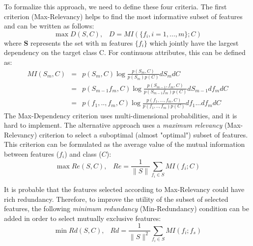 \documentclass[a4paper,fleqn]{report}
\begin{document}
To formalize this approach, we need to define these four criteria. The first criterion (Max-Relevancy) helps to find the most informative 
subset of features and can be written as follows:
\begin{equation} \label{eq:maxdep}
\max D \left( S, C \right),\;\;\; D=MI\left(\{f_i, i=1,...,m  \};C \right)
\end{equation}
where {\bf S} represents the set with m features $\{ f_i \}$ which jointly have the largest dependency on the target class C. 
For continuous attributes, this can be defined as:
\begin{eqnarray}
MI \left( S_m, C \right)  & = & p \left( S_m, C \right) \log \frac{p \left( S_m, C\right)}{p \left( S_m\right) p \left( C\right)} dS_{m}dC \\ \nonumber
                          & = & p \left( S_{m-1} f_m, C \right) \log \frac{p \left( S_{m-1}, f_m, C\right)}{p \left( S_{m-1} f_m\right) p \left( C\right)} dS_{m-1}df_{m}dC \\ \nonumber
                          & = & p \left( f_{1}, .. ,f_m,	 C \right) \log \frac{p \left( f_{1},...,f_m, C\right)}{p \left( f_{1},..,f_m\right) p \left( C\right)} df_{1} ... df_{m}dC 
\end{eqnarray}
The Max-Dependency criterion uses multi-dimensional probabilities, and it is hard to implement. 
The alternative approach uses a
{\it maximum relevancy} (Max-Relevancy) criterion to select a suboptimal (almost "optimal") subset of features. 
This criterion can be formulated 
as the average value of the mutual information between features ($f_i$) and class ($C$):
\begin{equation}\label{eq:maxrel}
\max Re \left( S, C \right),\;\;\; Re= \frac{1}{\|S\|} \sum_{f_i \in S} MI\left(f_i ;C \right)
\end{equation}

It is probable that the features selected according to Max-Relevancy could have rich redundancy. Therefore, 
to improve the utility of the subset of selected features, the following {\it minimum redundancy} 
(Min-Redundancy) condition can be added in order to select mutually exclusive features:
\begin{equation}\label{eq:maxred}
\min Rd \left( S, C \right), \;\;\ Rd = \frac{1}{\|S\|^2} \sum_{f_i \in S} MI\left(f_i ;f_s \right)
\end{equation}
\end{document}
